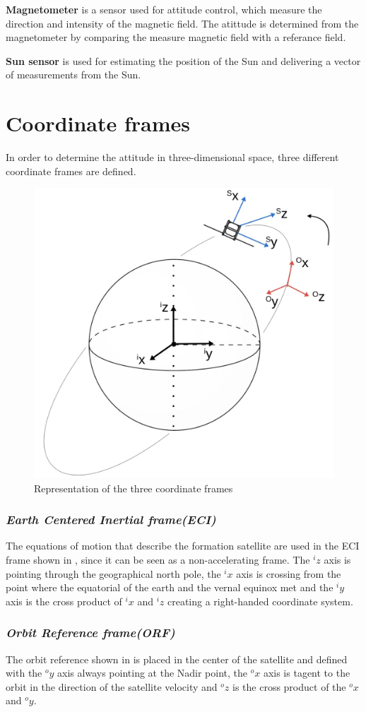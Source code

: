 \textbf{Magnetometer} is a sensor used for attitude control, which measure the direction and intensity of the magnetic field. The atittude is determined from the magnetometer by comparing the measure magnetic field with a referance field.

\textbf{Sun sensor} is used for estimating the position of the Sun and delivering a vector of measurements from the Sun.
\section{Coordinate frames}
In order to determine the attitude in three-dimensional space, three different coordinate frames are defined.
\begin{figure}[H]
	\centering
	\includegraphics[width=0.7\linewidth]{figures/ref_frames}
	\caption{Representation of the three coordinate frames }
	\label{fig:ref_frames}
\end{figure}
\subsubsection{\textit{Earth Centered Inertial frame(ECI)}}
The equations of motion that describe the formation satellite are used in the ECI frame shown in , since it can be seen as a non-accelerating frame. The $^iz$ axis is pointing through the geographical north pole, the $^ix$ axis is crossing from the point where the equatorial of the earth and the vernal equinox met and the $^iy$ axis is the cross product of $^ix$ and $^iz$ creating a right-handed coordinate system. 
\subsubsection{\textit{Orbit Reference frame(ORF)}}
The orbit reference shown in  is placed in the center of the satellite and defined with the $^oy$ axis always pointing at the Nadir point, the $^ox$ axis is tagent to the orbit in the direction of the satellite velocity and $^oz$ is the cross product of the $^ox$  and $^oy$. 
